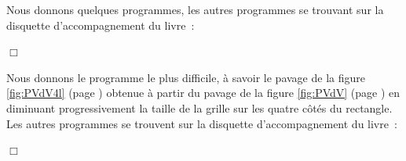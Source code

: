 \clearpage
\begin{corrige}{
\renewcommand{\carrenoir}{\hspace{-4mm}\rule{1.5mm}{1.5mm}\hspace{2.5mm}}
Nous donnons quelques programmes, les autres programmes se trouvant sur la disquette
 d'accompagnement du livre~:


\renewcommand{\carrenoir}{}
\noindent $\Box$}\end{corrige}
\begin{corrige}{
Nous donnons le programme le plus difficile, à savoir le pavage de la figure
\ref{fig:PVdV4l} (page \pageref{fig:PVdV4l}) obtenue à
partir du pavage de la figure \ref{fig:PVdV} (page \pageref{fig:PVdV}) en diminuant pro\-gres\-si\-ve\-ment la tail\-le de la gril\-le sur les 
qua\-tre côtés du rectangle. Les autres programmes se trouvent sur la disquette  d'accompagnement du livre~:

\noindent $\Box$}\end{corrige}

